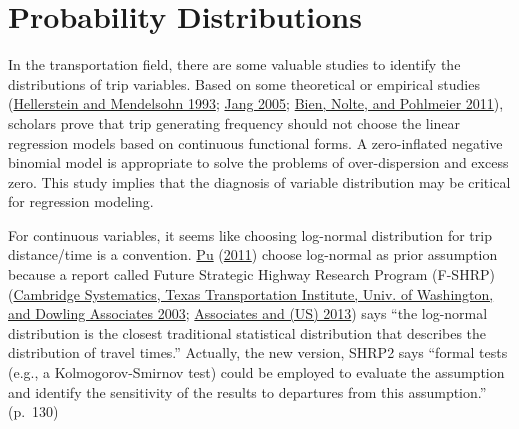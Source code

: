 \documentclass[
  11pt,
  openany]{memoir}
\begin{document}
\hypertarget{probability-distributions}{%
\section{Probability Distributions}\label{probability-distributions}}

In the transportation field, there are some valuable studies to identify the distributions of trip variables. Based on some theoretical or empirical studies (\protect\hyperlink{ref-hellersteinTheoreticalFoundationCount1993}{Hellerstein and Mendelsohn 1993}; \protect\hyperlink{ref-jangCountDataModels2005}{Jang 2005}; \protect\hyperlink{ref-bienInflatedMultivariateInteger2011}{Bien, Nolte, and Pohlmeier 2011}), scholars prove that trip generating frequency should not choose the linear regression models based on continuous functional forms. A zero-inflated negative binomial model is appropriate to solve the problems of over-dispersion and excess zero. This study implies that the diagnosis of variable distribution may be critical for regression modeling.

For continuous variables, it seems like choosing log-normal distribution for trip distance/time is a convention. \protect\hyperlink{ref-puAnalyticRelationshipsTravel2011}{Pu} (\protect\hyperlink{ref-puAnalyticRelationshipsTravel2011}{2011}) choose log-normal as prior assumption because a report called Future Strategic Highway Research Program (F-SHRP) (\protect\hyperlink{ref-cambridge2003providing}{Cambridge Systematics, Texas Transportation Institute, Univ. of Washington, and Dowling Associates 2003}; \protect\hyperlink{ref-kittelson2013evaluating}{Associates and (US) 2013}) says ``the log-normal distribution is the closest traditional statistical distribution that describes the distribution of travel times.'' Actually, the new version, SHRP2 says ``formal tests (e.g., a Kolmogorov-Smirnov test) could be employed to evaluate the assumption and identify the sensitivity of the results to departures from this assumption.'' (p.~130)
\end{document}
